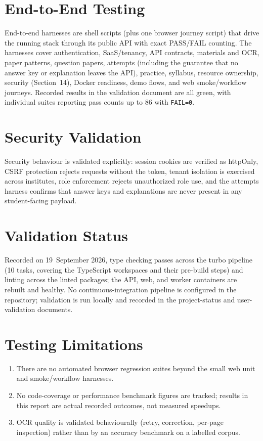 \section{End-to-End Testing}

End-to-end harnesses are shell scripts (plus one browser journey script) that
drive the running stack through its public API with exact PASS/FAIL counting.
The harnesses cover authentication, SaaS/tenancy, API contracts, materials
and OCR, paper patterns, question papers, attempts (including the guarantee
that no answer key or explanation leaves the API), practice, syllabus,
resource ownership, security (Section~14), Docker readiness, demo flows, and
web smoke/workflow journeys. Recorded results in the validation document are
all green, with individual suites reporting pass counts up to 86 with
\texttt{FAIL=0}.

\section{Security Validation}

Security behaviour is validated explicitly: session cookies are verified as
httpOnly, CSRF protection rejects requests without the token, tenant
isolation is exercised across institutes, role enforcement rejects
unauthorized role use, and the attempts harness confirms that answer keys and
explanations are never present in any student-facing payload.

\section{Validation Status}

Recorded on 19~September 2026, type checking passes across the turbo pipeline
(10 tasks, covering the TypeScript workspaces and their pre-build steps) and
linting across the linted packages; the API, web, and worker containers are
rebuilt and healthy. No continuous-integration pipeline is configured in the
repository; validation is run locally and recorded in the project-status and
user-validation documents.

\section{Testing Limitations}

\begin{enumerate}
  \item There are no automated browser regression suites beyond the small web
        unit and smoke/workflow harnesses.
  \item No code-coverage or performance benchmark figures are tracked; results
        in this report are actual recorded outcomes, not measured speedups.
  \item OCR quality is validated behaviourally (retry, correction, per-page
        inspection) rather than by an accuracy benchmark on a labelled corpus.
\end{enumerate}
